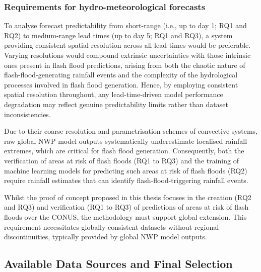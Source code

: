 \subsubsection{Requirements for hydro-meteorological forecasts}

To  analyse forecast predictability from short-range (i.e., up to day 1; RQ1 and RQ2) to medium-range lead times (up to day 5; RQ1 and RQ3), a system providing consistent spatial resolution across all lead times would be preferable. Varying resolutions would compound extrinsic uncertainties with those intrinsic ones present in flash flood predictions, arising from both the chaotic nature of flash-flood-generating rainfall events and the complexity of the hydrological processes involved in flash flood generation. Hence, by employing consistent spatial resolution throughout, any lead-time-driven model performance degradation may reflect genuine predictability limits rather than dataset inconsistencies.

Due  to their coarse resolution and parametrisation schemes of convective systems, raw global NWP model outputs systematically underestimate localised rainfall extremes, which are critical for flash flood generation. Consequently, both the verification of areas at risk of flash floods (RQ1 to RQ3) and the training of machine learning models for predicting such areas at risk of flash floods (RQ2) require rainfall estimates that can identify flash-flood-triggering rainfall events. 

Whilst  the proof of concept proposed in this thesis focuses in the creation (RQ2 and RQ3) and verification (RQ1 to RQ3) of predictions of areas at risk of flash floods over the CONUS, the methodology must support global extension. This requirement necessitates globally consistent datasets without regional discontinuities, typically provided by global NWP model outputs.


\subsection{Available Data Sources and Final Selection}
\label{experimental_data_requirements_final_selection}


